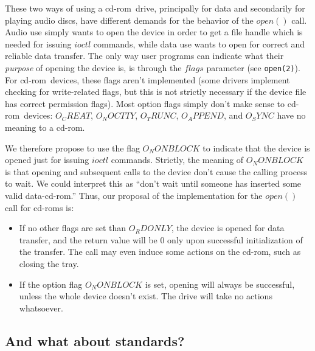 \documentclass{article}
\def\cdrom{{\sc cd-rom}}
\begin{document}
These two ways of using a \cdrom\ drive, principally for data and
secondarily for playing audio discs, have different demands for the
behavior of the $open()$ call. Audio use simply wants to open the
device in order to get a file handle which is needed for issuing
$ioctl$ commands, while data use wants to open for correct and
reliable data transfer. The only way user programs can indicate what
their {\em purpose\/} of opening the device is, is through the $flags$
parameter (see {\tt {open(2)}}). For \cdrom\ devices, these flags aren't
implemented (some drivers implement checking for write-related flags,
but this is not strictly necessary if the device file has correct
permission flags). Most option flags simply don't make sense to
\cdrom\ devices: $O_CREAT$, $O_NOCTTY$, $O_TRUNC$, $O_APPEND$, and
$O_SYNC$ have no meaning to a \cdrom. 

We therefore propose to use the flag $O_NONBLOCK$ to indicate
that the device is opened just for issuing $ioctl$
commands. Strictly, the meaning of $O_NONBLOCK$ is that opening and
subsequent calls to the device don't cause the calling process to
wait. We could interpret this as ``don't wait until someone has
inserted some valid data-\cdrom.'' Thus, our proposal of the
implementation for the $open()$ call for \cdrom s is:
\begin{itemize}
\item If no other flags are set than $O_RDONLY$, the device is opened
for data transfer, and the return value will be 0 only upon successful
initialization of the transfer. The call may even induce some actions
on the \cdrom, such as closing the tray.  
\item If the option flag $O_NONBLOCK$ is set, opening will always be
successful, unless the whole device doesn't exist. The drive will take
no actions whatsoever. 
\end{itemize}

\subsection{And what about standards?}
\end{document}
